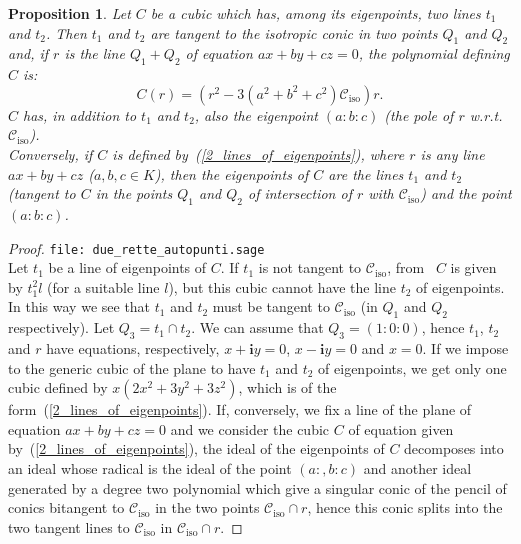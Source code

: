 \documentclass[11pt, a4paper, reqno, captions=tableheading,bibliography=totoc]{scrartcl}
\theoremstyle{plain}
\newtheorem{prop}[lemma]{Proposition}
\theoremstyle{definition}
\newcommand{\iso}{\mathcal{C}_{\mathrm{iso}}}
\newcommand{\iii}{\textbf{i}}
\begin{document}
\begin{prop}
\label{cubiche_con_2_rette}
Let $C$ be a cubic which has, among its eigenpoints, two lines $t_1$ 
and $t_2$. Then $t_1$ and $t_2$ are tangent to the isotropic conic
in two points $Q_1$ and $Q_2$ and, if $r$ is the line $Q_1+Q_2$
of equation $ax+by+cz=0$, the polynomial defining $C$ is:
\begin{equation}
C(r) = \left(r^2-3\left(a^2+b^2+c^2\right)\iso\right)r.
\label{2_lines_of_eigenpoints}
\end{equation}
$C$ has, in addition to $t_1$ and $t_2$, also the eigenpoint $(a: b: c)$
(the pole of $r$ w.r.t.\ $\iso$). \\
Conversely, if $C$ is defined by~(\ref{2_lines_of_eigenpoints}), where
$r$ is any line $ax+by+cz$ ($a, b, c \in K$), then
the eigenpoints of $C$ are the lines $t_1$ and $t_2$ (tangent to $C$
in the points $Q_1$ and $Q_2$ of intersection of $r$ with $\iso$) and
the point $(a: b: c)$.
\end{prop}
\begin{proof}
\verb+file: due_rette_autopunti.sage+\\
Let $t_1$ be a line of eigenpoints of $C$. If $t_1$ is not tangent 
to $\iso$, from~ $C$ is given by $t_1^2l$ (for
a suitable line $l$), but this cubic cannot have the line $t_2$
of eigenpoints.
In this way we see that $t_1$ and $t_2$ must be tangent to $\iso$ (in
$Q_1$ and $Q_2$ respectively). Let $Q_3 = t_1 \cap t_2$. We can assume
that $Q_3 = (1: 0: 0)$, hence $t_1$, $t_2$ and $r$ have equations,
respectively, $x+\iii y=0$, $x-\iii y = 0$ and  $x=0$.
If we impose to the generic cubic of the plane to have 
$t_1$ and $t_2$ of eigenpoints, we get only one cubic defined by
$x(2x^2 + 3y^2 + 3z^2)$, which is of the
form~(\ref{2_lines_of_eigenpoints}). If, conversely, we fix a line
of the plane of equation $ax+by+cz=0$ and we consider the cubic $C$ of
equation given by~(\ref{2_lines_of_eigenpoints}), the ideal of
the eigenpoints of $C$ decomposes into an ideal whose radical is
the ideal of the point $(a:, b: c)$ and another ideal generated by
a degree two polynomial which give a singular conic of the pencil
of conics bitangent to $\iso$ in the two points $\iso \cap r$, hence
this conic splits into the two tangent lines to $\iso$ in $\iso \cap r$.
\end{proof}
\end{document}
